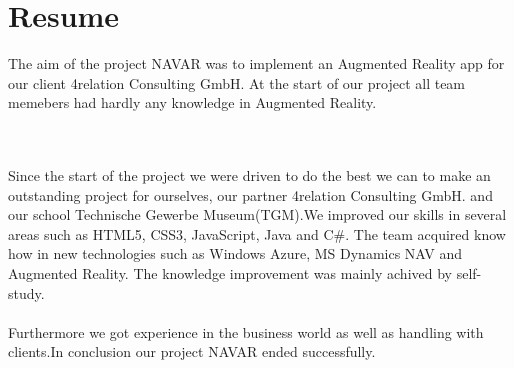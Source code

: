 \chapter{Resume}\label{chapter:Resume}
The aim of the project NAVAR was to implement an Augmented Reality app for our client 4relation Consulting GmbH. At the start of our project all team memebers had hardly any knowledge in Augmented Reality. 


\
\\\\
Since the start of the project we were driven to do the best we can to make an outstanding project for ourselves, our partner 4relation Consulting GmbH. and our school Technische Gewerbe Museum(TGM).We improved our skills in several areas such as HTML5, CSS3, JavaScript, Java and C\#. The team acquired know how in new technologies such as Windows Azure, MS Dynamics NAV and Augmented Reality. The knowledge improvement was mainly achived by self-study. 
\\
\\
 Furthermore we got experience in the business world as well as handling with clients.In conclusion our project NAVAR ended successfully. 
\clearpage